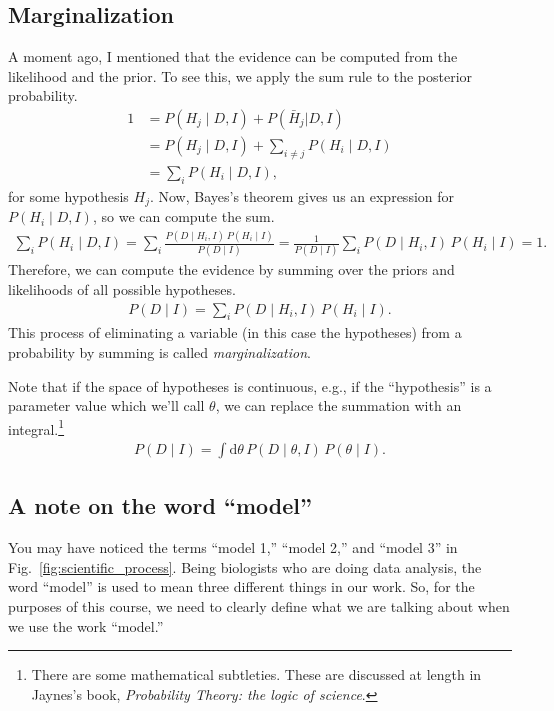 \subsection{Marginalization}
A moment ago, I mentioned that the evidence can be computed from the
likelihood and the prior.  To see this, we apply the sum rule to the
posterior probability.
\begin{align}
1 &= P(H_j\mid D,I) + P(\bar{H}_j | D,I) \\
&= P(H_j\mid D,I) + \sum_{i\ne j}P(H_i\mid D,I) \\
&= \sum_iP(H_i\mid D,I),
\end{align}
for some hypothesis $H_j$.  Now, Bayes's theorem gives us an
expression for $P(H_i\mid D, I)$, so we can compute the sum.
\begin{align}
\sum_iP(H_i\mid D,I) = \sum_i\frac{P(D \mid H_i, I)\, P(H_i \mid I)}{P(D \mid I)}
= \frac{1}{P(D\mid I)}\sum_i P(D \mid H_i, I)\, P(H_i \mid I) = 1.
\end{align}
Therefore, we can compute the evidence by summing over the priors and
likelihoods of all possible hypotheses.
\begin{align}
P(D\mid I) = \sum_i P(D \mid H_i, I)\, P(H_i \mid I).
\end{align}
This process of eliminating a variable (in this case the hypotheses)
from a probability by summing is called \textit{marginalization}.

Note that if the space of hypotheses is continuous, e.g., if the
``hypothesis'' is a parameter value which we'll call $\theta$, we can
replace the summation with an integral.\footnote{There are some
  mathematical subtleties.  These are discussed at length in Jaynes's
  book, \textit{Probability Theory: the logic of science}.}
\begin{align}
P(D\mid I) = \int \mathrm{d}\theta\,P(D\mid \theta, I)\, P(\theta \mid I).
\end{align}

\subsection{A note on the word ``model''}
You may have noticed the terms ``model 1,'' ``model 2,'' and ``model
3'' in Fig.~\ref{fig:scientific_process}.  Being biologists who are
doing data analysis, the word ``model'' is used to mean three
different things in our work.  So, for the purposes of this course, we
need to clearly define what we are talking about when we use the work
``model.''

